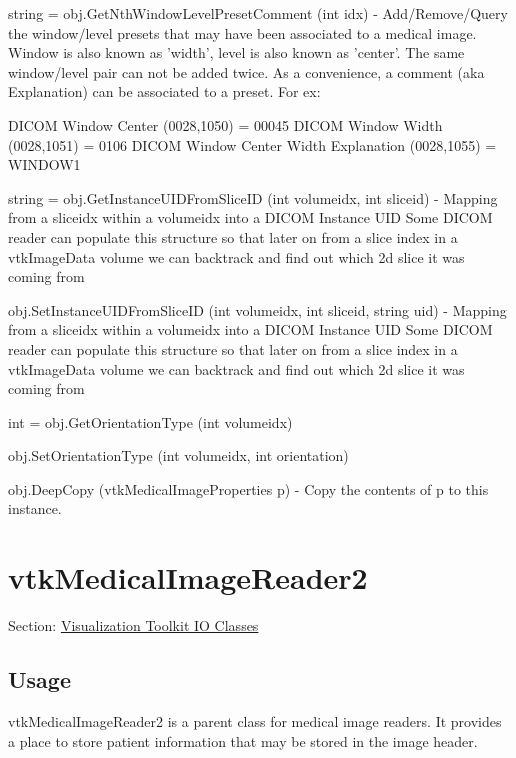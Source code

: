 \begin{DoxyItemize}
\item {\ttfamily string = obj.\-Get\-Nth\-Window\-Level\-Preset\-Comment (int idx)} -\/ Add/\-Remove/\-Query the window/level presets that may have been associated to a medical image. Window is also known as 'width', level is also known as 'center'. The same window/level pair can not be added twice. As a convenience, a comment (aka Explanation) can be associated to a preset. For ex\-: \begin{DoxyVerb}         DICOM Window Center (0028,1050) = 00045
         DICOM Window Width  (0028,1051) = 0106
         DICOM Window Center Width Explanation (0028,1055) = WINDOW1\end{DoxyVerb}
  
\item {\ttfamily string = obj.\-Get\-Instance\-U\-I\-D\-From\-Slice\-I\-D (int volumeidx, int sliceid)} -\/ Mapping from a sliceidx within a volumeidx into a D\-I\-C\-O\-M Instance U\-I\-D Some D\-I\-C\-O\-M reader can populate this structure so that later on from a slice index in a vtk\-Image\-Data volume we can backtrack and find out which 2d slice it was coming from  
\item {\ttfamily obj.\-Set\-Instance\-U\-I\-D\-From\-Slice\-I\-D (int volumeidx, int sliceid, string uid)} -\/ Mapping from a sliceidx within a volumeidx into a D\-I\-C\-O\-M Instance U\-I\-D Some D\-I\-C\-O\-M reader can populate this structure so that later on from a slice index in a vtk\-Image\-Data volume we can backtrack and find out which 2d slice it was coming from  
\item {\ttfamily int = obj.\-Get\-Orientation\-Type (int volumeidx)}  
\item {\ttfamily obj.\-Set\-Orientation\-Type (int volumeidx, int orientation)}  
\item {\ttfamily obj.\-Deep\-Copy (vtk\-Medical\-Image\-Properties p)} -\/ Copy the contents of p to this instance.  
\end{DoxyItemize}\hypertarget{vtkio_vtkmedicalimagereader2}{}\section{vtk\-Medical\-Image\-Reader2}\label{vtkio_vtkmedicalimagereader2}
Section\-: \hyperlink{sec_vtkio}{Visualization Toolkit I\-O Classes} \hypertarget{vtkwidgets_vtkxyplotwidget_Usage}{}\subsection{Usage}\label{vtkwidgets_vtkxyplotwidget_Usage}
vtk\-Medical\-Image\-Reader2 is a parent class for medical image readers. It provides a place to store patient information that may be stored in the image header.

